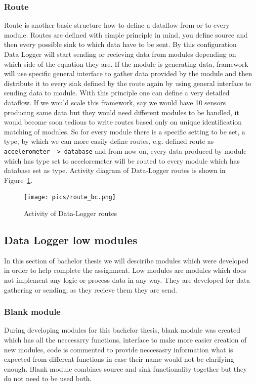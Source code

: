 \subsubsection{Route} %
\label{ssub:route}
Route is another basic structure how to define a dataflow from or to every module. Routes are defined with simple principle in mind, you define source and then every possible sink to which data have to be sent. By this configuration Data Logger will start sending or recieving data from modules depending on which side of the equation they are. If the module is generating data, framework will use specific general interface to gather data provided by the module and then distribute it to every sink defined by the route again by using general interface to sending data to module. With this principle one can define a very detailed dataflow. If we would scale this framework, say we would have 10 sensors producing same data but they would need different modules to be handled, it would become soon tedious to write routes based only on unique identification matching of modules. So for every module there is a specific setting to be set, a type, by which we can more easily define routes, e.g. defined route as \verb|accelerometer -> database| and from now on, every data produced by module which has type set to acceloremeter will be routed to every module which has database set as type. Activity diagram of Data-Logger routes is shown in Figure~\ref{fig:act}. 
\begin{figure}[H]
\begin{center}
\captionsetup{font=small}
\texttt{[image: pics/route\_bc.png]}
\caption{Activity of Data-Logger routes}
\label{fig:act}
\end{center}
\end{figure}
\label{sub:data_logger_framework}
\subsection{Data Logger low modules}

In this section of bachelor thesis we will desciribe modules which were developed in order to help complete the assignment. Low modules are modules which does not implement any logic or process data in any way. They are developed for data gathering or sending, as they recieve them they are send.
\subsubsection{Blank module} %
\label{ssub:blank_module}
During developing modules for this bachelor thesis, blank module was created which has all the neccesarry functions, interface to make more easier creation of new modules, code is commented to provide neccesasry information what is expected from different functions in case their name would not be clarifying enough. Blank module combines source and sink functionality together but they do not need to be used both.
